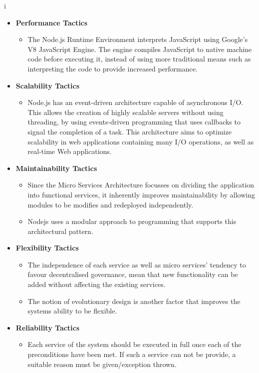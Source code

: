 i\documentclass[a4paper,12pt]{article}
\begin{document}
	\begin{itemize}
		\item\textbf{Performance Tactics}
		\begin{itemize}
			\item The Node.js Runtime Environment interprets JavaScript using Google’s V8 JavaScript Engine. The engine compiles JavaScript to native machine code before executing it, instead of using more traditional means such as interpreting the code to provide increased performance.
		\end{itemize}
		
		\item\textbf{Scalability Tactics}
		\begin{itemize}
			\item Node.js has an event-driven architecture capable of asynchronous I/O. This allows the creation of highly scalable servers without using threading, by using events-driven programming that uses callbacks to signal the completion of a task. This architecture aims to optimize scalability in web applications containing many I/O operations, as well as real-time Web applications. 
		\end{itemize}
		
		\item\textbf{Maintainability Tactics}
		\begin{itemize}
			\item Since the Micro Services Architecture focusses on dividing the application into functional services, it inherently improves maintainability by allowing modules to be modifies and redeployed independently.
			\item Nodejs uses a modular approach to programming that supports this architectural pattern. 
		\end{itemize}
		
		\item\textbf{Flexibility Tactics}
		\begin{itemize}
			\item The independence of each service as well as micro services' tendency to favour decentralised governance, mean that new functionality can be added without affecting the existing services.
			\item The notion of evolutionary design is another factor that improves the systems ability to be flexible.
		\end{itemize}
		
		\item\textbf{Reliability Tactics}
		\begin{itemize}
			\item Each service of the system should be executed in full once each of the preconditions have been met. If such a service can not be provide, a suitable reason must be given/exception thrown.
		\end{itemize}
		

\end{itemize}
\end{document}
